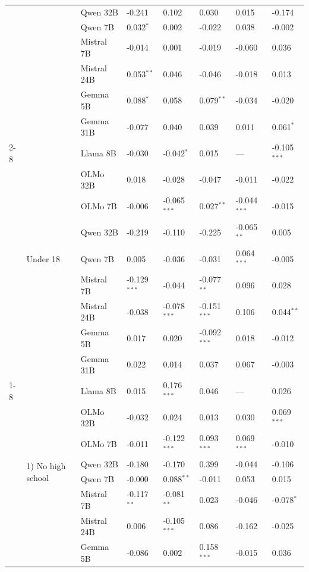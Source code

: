 \begin{longtable}[t]{llllllll}
 &  & Qwen 32B & -0.241 & 0.102 & 0.030 & 0.015 & -0.174 \\
 &  & Qwen 7B & 0.032$^{*}$ & 0.002 & -0.022 & 0.038 & -0.002 \\
 &  & Mistral 7B & -0.014 & 0.001 & -0.019 & -0.060 & 0.036 \\
 &  & Mistral 24B & 0.053$^{**}$ & 0.046 & -0.046 & -0.018 & 0.013 \\
 &  & Gemma 5B & 0.088$^{*}$ & 0.058 & 0.079$^{**}$ & -0.034 & -0.020 \\
 &  & Gemma 31B & -0.077 & 0.040 & 0.039 & 0.011 & 0.061$^{*}$ \\
\cline{2-8}
 & \multirow[t]{9}{*}{Under 18} & Llama 8B & -0.030 & -0.042$^{*}$ & 0.015 & --- & -0.105$^{***}$ \\
 &  & OLMo 32B & 0.018 & -0.028 & -0.047 & -0.011 & -0.022 \\
 &  & OLMo 7B & -0.006 & -0.065$^{***}$ & 0.027$^{**}$ & -0.044$^{***}$ & -0.015 \\
 &  & Qwen 32B & -0.219 & -0.110 & -0.225 & -0.065$^{**}$ & 0.005 \\
 &  & Qwen 7B & 0.005 & -0.036 & -0.031 & 0.064$^{***}$ & -0.005 \\
 &  & Mistral 7B & -0.129$^{***}$ & -0.044 & -0.077$^{**}$ & 0.096 & 0.028 \\
 &  & Mistral 24B & -0.038 & -0.078$^{***}$ & -0.151$^{***}$ & 0.106 & 0.044$^{**}$ \\
 &  & Gemma 5B & 0.017 & 0.020 & -0.092$^{***}$ & 0.018 & -0.012 \\
 &  & Gemma 31B & 0.022 & 0.014 & 0.037 & 0.067 & -0.003 \\
\cline{1-8} \cline{2-8}
\multirow[t]{90}{*}{Education} & \multirow[t]{9}{*}{1) No high school} & Llama 8B & 0.015 & 0.176$^{***}$ & 0.046 & --- & 0.026 \\
 &  & OLMo 32B & -0.032 & 0.024 & 0.013 & 0.030 & 0.069$^{***}$ \\
 &  & OLMo 7B & -0.011 & -0.122$^{***}$ & 0.093$^{***}$ & 0.069$^{***}$ & -0.010 \\
 &  & Qwen 32B & -0.180 & -0.170 & 0.399 & -0.044 & -0.106 \\
 &  & Qwen 7B & -0.000 & 0.088$^{**}$ & -0.011 & 0.053 & 0.015 \\
 &  & Mistral 7B & -0.117$^{**}$ & -0.081$^{**}$ & 0.023 & -0.046 & -0.078$^{*}$ \\
 &  & Mistral 24B & 0.006 & -0.105$^{***}$ & 0.086 & -0.162 & -0.025 \\
 &  & Gemma 5B & -0.086 & 0.002 & 0.158$^{***}$ & -0.015 & 0.036 \\

\end{longtable}
